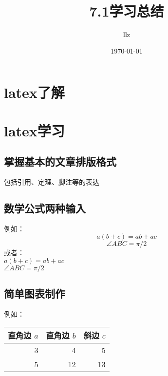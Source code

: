 \documentclass[UTF8]{ctexart}
\title{7.1学习总结}
\author{llz}
\date{\today}
\begin{document}
\maketitle
\section{latex了解}
\section{latex学习}
\subsection{掌握基本的文章排版格式}
包括引用、定理、脚注等的表达
\subsection{数学公式两种输入}
例如：\\
\begin{equation}
a(b+c)=ab+ac
\end{equation}
\begin{equation}
\angle ABC=\pi/2
\end{equation}
或者：\\
$a(b+c)=ab+ac$\\
$\angle ABC=\pi/2$
\subsection{简单图表制作}
例如：\\
\begin{tabular}{|rrr|}
\hline
直角边 $a$ & 直角边 $b$ & 斜边 $c$\\
\hline
3 & 4 & 5\\
5 & 12 & 13\\
\hline
\end{tabular}
\end{document}
